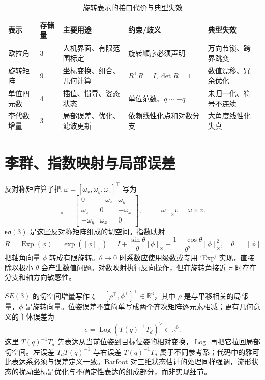 \begin{table}[H]
\centering
\caption{旋转表示的接口代价与典型失效}
\label{tab:rotation-representations}
\small
\begin{tabularx}{\textwidth}{p{}p{}p{}p{}Y}
\toprule
表示 & 存储量 & 主要用途 & 约束/歧义 & 典型失效\\
\midrule
欧拉角 & 3 & 人机界面、有限范围标定 & 旋转顺序必须声明 & 万向节锁、跨界跳变\\
旋转矩阵 & 9 & 坐标变换、组合、几何计算 & $R^\top R=I,\det R=1$ & 数值漂移、冗余优化\\
单位四元数 & 4 & 插值、惯导、姿态状态 & 单位范数、$q\sim -q$ & 未归一化、符号不连续\\
李代数增量 & 3 & 局部误差、优化、滤波更新 & 依赖线性化点和对数分支 & 大角度线性化失真\\
\bottomrule
\end{tabularx}
\end{table}

\section{李群、指数映射与局部误差}

反对称矩阵算子把 $\omega=[\omega_x,\omega_y,\omega_z]^\top$ 写为
\begin{equation}
[\omega]_\times=
\begin{bmatrix}
0&-\omega_z&\omega_y\\
\omega_z&0&-\omega_x\\
-\omega_y&\omega_x&0
\end{bmatrix},\qquad [\omega]_\times v=\omega\times v.
\end{equation}
$\mathfrak{so}(3)$ 是这些反对称矩阵组成的切空间。指数映射
\begin{equation}
R=\operatorname{Exp}(\phi)=\exp([\phi]_\times)
=I+\frac{\sin\theta}{\theta}[\phi]_\times
+\frac{1-\cos\theta}{\theta^2}[\phi]_\times^2,
\quad \theta=\lVert\phi\rVert
\label{eq:rodrigues}
\end{equation}
把轴角向量 $\phi$ 转成有限旋转。$\theta\to0$ 时系数应使用级数或专用 `Exp` 实现，直接除以极小 $\theta$ 会产生数值问题。对数映射执行反向操作，但在旋转角接近 $\pi$ 时存在分支和轴方向敏感性。

$SE(3)$ 的切空间增量写作 $\xi=[\rho^\top,\phi^\top]^\top\in\mathbb{R}^6$，其中 $\rho$ 是与平移相关的局部量，$\phi$ 是旋转向量。位姿误差不宜简单写成两个齐次矩阵逐元素相减；更有几何意义的主体误差为
\begin{equation}
e=\operatorname{Log}(T(q)^{-1}T_d)^\vee\in\mathbb{R}^6.
\label{eq:se3-pose-error}
\end{equation}
这里 $T(q)^{-1}T_d$ 先表达从当前位姿到目标位姿的相对变换，$\operatorname{Log}$ 再把它拉回局部切空间。左误差 $T_dT(q)^{-1}$ 与右误差 $T(q)^{-1}T_d$ 属于不同参考系；代码中的雅可比表达系必须与误差定义一致。Barfoot 对三维状态估计的处理同样强调，流形状态的扰动坐标是优化与不确定性表达的组成部分，而非实现细节\cite{barfoot2024state}。

